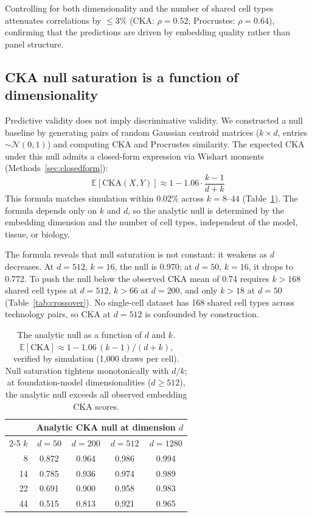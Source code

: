 \documentclass[11pt]{article}
\begin{document}
Controlling for both dimensionality and the number of shared cell types
attenuates correlations by $\leq 3\%$ (CKA: $\rho = 0.52$; Procrustes:
$\rho = 0.64$), confirming that the predictions are driven by embedding
quality rather than panel structure.


\subsection{CKA null saturation is a function of dimensionality}
\label{sec:nullfloor}

Predictive validity does not imply discriminative validity. We
constructed a null baseline by generating pairs of random Gaussian
centroid matrices ($k \times d$, entries $\sim \mathcal{N}(0,1)$) and
computing CKA and Procrustes similarity. The expected CKA under this
null admits a closed-form expression via Wishart moments
(Methods~\ref{sec:closedform}):
\begin{equation}
\label{eq:cka_null}
\mathbb{E}[\mathrm{CKA}(X, Y)] \approx 1 - 1.06 \cdot \frac{k-1}{d+k}
\end{equation}
This formula matches simulation within 0.02\% across $k = 8$--$44$
(Table~\ref{tab:nullfloor}). The formula depends only on $k$ and $d$,
so the analytic null is determined by the embedding dimension and the
number of cell types, independent of the model, tissue, or biology.

The formula reveals that null saturation is not constant: it weakens
as $d$ decreases. At $d = 512$, $k = 16$, the null is 0.970; at
$d = 50$, $k = 16$, it drops to 0.772. To push the null below the
observed CKA mean of 0.74 requires $k > 168$ shared cell types at
$d = 512$, $k > 66$ at $d = 200$, and only $k > 18$ at $d = 50$
(Table~\ref{tab:crossover}). No single-cell dataset has 168 shared cell
types across technology pairs, so CKA at $d = 512$ is confounded by
construction.

\begin{table}[t]
\centering
\caption{The analytic null as a function of $d$ and $k$.
$\mathbb{E}[\mathrm{CKA}] \approx 1 - 1.06\,(k{-}1)/(d{+}k)$,
verified by simulation (1,000 draws per cell). Null saturation tightens
monotonically with $d/k$; at foundation-model dimensionalities
($d \geq 512$), the analytic null exceeds all observed embedding CKA scores.}
\label{tab:nullfloor}
\small
\begin{tabular}{@{}rcccc@{}}
\toprule
& \multicolumn{4}{c}{Analytic CKA null at dimension $d$} \\
\cmidrule(lr){2-5}
$k$ & $d = 50$ & $d = 200$ & $d = 512$ & $d = 1280$ \\
\midrule
8  & 0.872 & 0.964 & 0.986 & 0.994 \\
14 & 0.785 & 0.936 & 0.974 & 0.989 \\
22 & 0.691 & 0.900 & 0.958 & 0.983 \\
44 & 0.515 & 0.813 & 0.921 & 0.965 \\
\bottomrule
\end{tabular}
\end{table}
\end{document}
